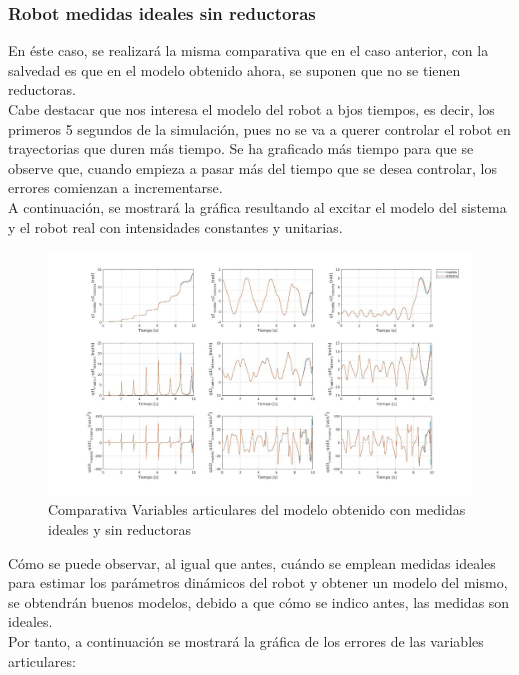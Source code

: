\subsubsection{Robot medidas ideales sin reductoras}
En éste caso, se realizará la misma comparativa que en el caso anterior, con la salvedad es que en el modelo obtenido ahora, se suponen que no se tienen reductoras.\\
Cabe destacar que nos interesa el modelo del robot a bjos tiempos, es decir, los primeros 5 segundos de la simulación, pues no se va a querer controlar el robot en trayectorias que duren más tiempo. Se ha graficado más tiempo para que se observe que, cuando empieza a pasar más del tiempo que se desea controlar, los errores comienzan a incrementarse.\\
A continuación, se mostrará la gráfica resultando al excitar el modelo del sistema y el robot real con intensidades constantes y unitarias.

\newpage
\begin{figure}[h!]
	\centering
	\includegraphics[width=1\textwidth]{EstimacParam_SisMod_In1_IdealSR}
	\caption{Comparativa Variables articulares del modelo obtenido con medidas ideales y sin reductoras}
\end{figure}

Cómo se puede observar, al igual que antes, cuándo se emplean medidas ideales para estimar los parámetros dinámicos del robot y obtener un modelo del mismo, se obtendrán buenos modelos, debido a que cómo se indico antes, las medidas son ideales. \\
Por tanto, a continuación se mostrará la gráfica de los errores de las variables articulares:

